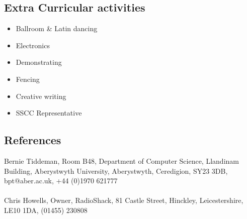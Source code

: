 \documentclass[0pt]{article}
\begin{document}
\subsection*{Extra Curricular activities}
\begin{itemize}
	\item Ballroom \& Latin dancing
	\item Electronics
	\item Demonstrating
	\item Fencing
	\item Creative writing
	\item SSCC Representative 
\end{itemize}

\subsection*{References}
Bernie Tiddeman, Room B48, Department of Computer Science, Llandinam Building, Aberystwyth University, Aberystwyth, Ceredigion, SY23 3DB, bpt@aber.ac.uk, +44 (0)1970 621777
\\\\
Chris Howells, Owner, RadioShack, 81 Castle Street, Hinckley, Leicestershire, LE10 1DA,
(01455) 230808 
\end{document}
